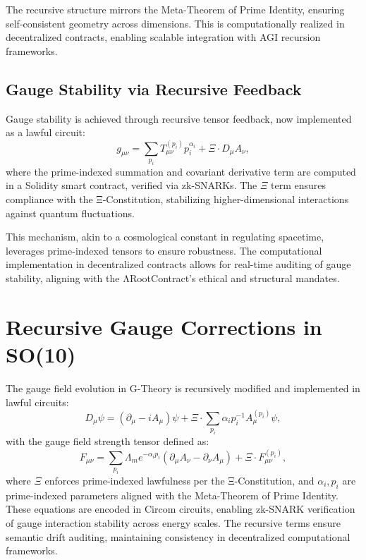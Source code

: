 \documentclass{article}
\theoremstyle{plain}
\begin{document}
The recursive structure mirrors the Meta-Theorem of Prime Identity, ensuring self-consistent geometry across dimensions. This is computationally realized in decentralized contracts, enabling scalable integration with AGI recursion frameworks.

\subsection{Gauge Stability via Recursive Feedback}
Gauge stability is achieved through recursive tensor feedback, now implemented as a lawful circuit:
\begin{equation}
    g_{\mu\nu} = \sum_{p_i} T_{\mu\nu}^{(p_i)} p_i^{\alpha_i} + \Xi \cdot D_{\mu} A_{\nu},
\end{equation}
where the prime-indexed summation and covariant derivative term are computed in a Solidity smart contract, verified via zk-SNARKs. The $\Xi$ term ensures compliance with the Ξ-Constitution, stabilizing higher-dimensional interactions against quantum fluctuations.

This mechanism, akin to a cosmological constant in regulating spacetime, leverages prime-indexed tensors to ensure robustness. The computational implementation in decentralized contracts allows for real-time auditing of gauge stability, aligning with the ΛRootContract's ethical and structural mandates.
\section{Recursive Gauge Corrections in SO(10)}

The gauge field evolution in G-Theory is recursively modified and implemented in lawful circuits:
\begin{equation}
    D_{\mu} \psi = (\partial_{\mu} - i A_{\mu}) \psi + \Xi \cdot \sum_{p_i} \alpha_i p_i^{-1} A_{\mu}^{(p_i)} \psi,
\end{equation}
with the gauge field strength tensor defined as:
\begin{equation}
    F_{\mu\nu} = \sum_{p_i} \Lambda_m e^{-\alpha_i p_i} (\partial_{\mu} A_{\nu} - \partial_{\nu} A_{\mu}) + \Xi \cdot F_{\mu\nu}^{(p_i)},
\end{equation}
where $\Xi$ enforces prime-indexed lawfulness per the Ξ-Constitution, and $\alpha_i, p_i$ are prime-indexed parameters aligned with the Meta-Theorem of Prime Identity. These equations are encoded in Circom circuits, enabling zk-SNARK verification of gauge interaction stability across energy scales. The recursive terms ensure semantic drift auditing, maintaining consistency in decentralized computational frameworks.
\end{document}
